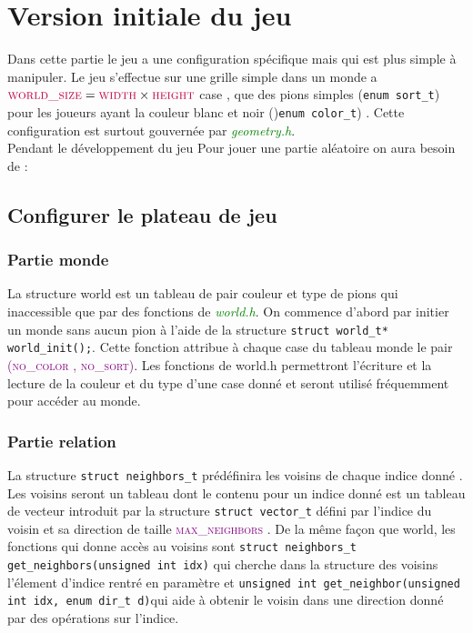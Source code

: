 \documentclass[a4paper]{article}
\begin{document}
\section{Version initiale du jeu}
Dans cette partie le jeu a une configuration spécifique mais qui est plus simple à manipuler. Le jeu s’effectue sur une grille simple dans un monde a $\textcolor{purple}{\textsc{world\_size}} = \textcolor{purple}{\textsc{width}} \times \textcolor{purple}{\textsc{height}}$  case , que des pions simples (\lstinline|enum sort_t|) pour les joueurs ayant la couleur blanc et noir ()\lstinline|enum color_t|) . Cette configuration est surtout gouvernée par \textcolor{green}{\textit{geometry.h}}. \\
Pendant le développement du jeu 
Pour jouer une partie aléatoire on aura besoin de :
\subsection{Configurer le plateau de jeu}
\subsubsection{Partie monde}
La structure world est un tableau de pair couleur et type de pions qui inaccessible que par des fonctions de \textcolor{green}{\textit{world.h}}. On commence d’abord par initier un monde sans aucun pion à l’aide de la structure \lstinline|struct world_t* world_init();|. Cette fonction attribue à chaque case du tableau monde le pair \textcolor{purple}{\textsc{(no\_color , no\_sort)}}. Les fonctions de world.h permettront l’écriture et la lecture de la couleur et du type d’une case donné et seront utilisé fréquemment pour accéder au monde.  

\subsubsection{Partie relation}
La structure \lstinline|struct neighbors_t| prédéfinira les voisins de chaque indice donné . Les voisins seront un tableau dont le contenu pour un indice donné est un tableau de vecteur introduit par la structure \lstinline|struct vector_t| défini par l’indice du voisin et sa direction de taille \textcolor{purple}{\textsc{max\_neighbors}} . De la même façon que world, les fonctions qui donne accès au voisins sont \lstinline|struct neighbors_t get_neighbors(unsigned int idx)| qui cherche dans la structure des voisins l’élement d’indice rentré en paramètre et \lstinline|unsigned int get_neighbor(unsigned int idx, enum dir_t d)|qui aide à obtenir le voisin dans une direction donné par des opérations sur l’indice.\\ 
\end{document}
